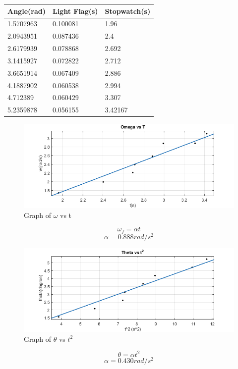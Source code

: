 \begin{center}
\begin{tabular}{|l|l|l|}
\hline
Angle(rad) & Light Flag(s) & Stopwatch(s) \\ \hline
1.5707963  & 0.100081      & 1.96         \\ \hline
2.0943951  & 0.087436      & 2.4          \\ \hline
2.6179939  & 0.078868      & 2.692        \\ \hline
3.1415927  & 0.072822      & 2.712        \\ \hline
3.6651914  & 0.067409      & 2.886        \\ \hline
4.1887902  & 0.060538      & 2.994        \\ \hline
4.712389   & 0.060429      & 3.307        \\ \hline
5.2359878  & 0.056155      & 3.42167      \\ \hline
\end{tabular}
\end{center}

\newpage
\begin{figure}[h!]
    \centering
    \includegraphics[width=\textwidth]{figures/omega_vs_t.png}
    \caption{Graph of $\omega$ vs t}
    \label{fig:yx}
\end{figure}
$$ \omega_f = \alpha t$$
$$ \alpha = 0.888 rad/s^2 $$


\begin{figure}[h!]
    \centering
    \includegraphics[width=\textwidth]{figures/theta_vs_t2.png}
    \caption{Graph of $\theta$ vs $t^2$}
    \label{fig:yx}
\end{figure}
$$ \theta = \alpha t^2$$
$$ \alpha = 0.430 rad/s^2 $$


